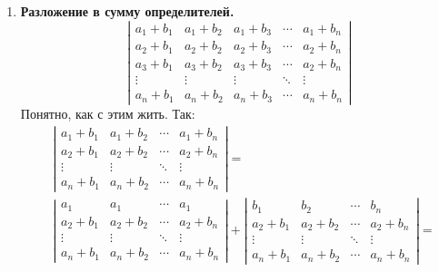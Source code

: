 \documentclass{article}
\begin{document}
\begin{enumerate}
$$\begin{aligned}
            3c_1+2c_2&=5\\
            9c_1+4c_2&=19
        \end{aligned}\right.
        $$
        Решив данную систему, получим $c_1=3$, $c_2=-2$. В итоге
        $$
        \Delta_n=3^{n+1}-2^{n+1}
        $$
        \item \textbf{Разложение в сумму определителей.}
        $$
        \left|\begin{matrix}
            a_1+b_1 & a_1+b_2 & a_1+b_3 & \cdots & a_1+b_n\\
            a_2+b_1 & a_2+b_2 & a_2+b_3 & \cdots & a_2+b_n\\
            a_3+b_1 & a_3+b_2 & a_3+b_3 & \cdots & a_2+b_n\\
            \vdots & \vdots & \vdots & \ddots & \vdots\\
            a_n+b_1 & a_n+b_2 & a_n+b_3 &\cdots & a_n+b_n
        \end{matrix}\right|
        $$
        Понятно, как с этим жить. Так:
        \[
        \begin{aligned}
            &\left|\begin{matrix}
                a_1+b_1 & a_1+b_2 & \cdots & a_1+b_n\\
                a_2+b_1 & a_2+b_2 & \cdots & a_2+b_n\\
                \vdots & \vdots & \ddots & \vdots\\
                a_n+b_1 & a_n+b_2 &\cdots & a_n+b_n
            \end{matrix}\right|=\\
            &\left|\begin{matrix}
                a_1 & a_1 & \cdots & a_1\\
                a_2+b_1 & a_2+b_2 & \cdots & a_2+b_n\\
                \vdots & \vdots & \ddots & \vdots\\
                a_n+b_1 & a_n+b_2 &\cdots & a_n+b_n
            \end{matrix}\right|+
            \left|\begin{matrix}
                b_1 & b_2 & \cdots & b_n\\
                a_2+b_1 & a_2+b_2 & \cdots & a_2+b_n\\
                \vdots & \vdots & \ddots & \vdots\\
                a_n+b_1 & a_n+b_2 &\cdots & a_n+b_n
            \end{matrix}\right|=\\

\end{aligned}\]
\end{enumerate}
\end{document}

